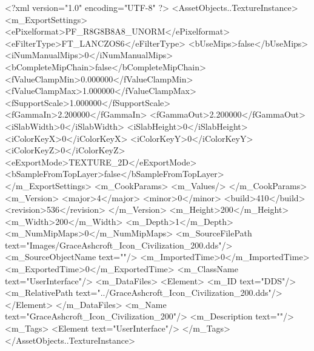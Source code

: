 <?xml version="1.0" encoding="UTF-8" ?>
<AssetObjects..TextureInstance>
	<m_ExportSettings>
		<ePixelformat>PF_R8G8B8A8_UNORM</ePixelformat>
		<eFilterType>FT_LANCZOS6</eFilterType>
		<bUseMips>false</bUseMips>
		<iNumManualMips>0</iNumManualMips>
		<bCompleteMipChain>false</bCompleteMipChain>
		<fValueClampMin>0.000000</fValueClampMin>
		<fValueClampMax>1.000000</fValueClampMax>
		<fSupportScale>1.000000</fSupportScale>
		<fGammaIn>2.200000</fGammaIn>
		<fGammaOut>2.200000</fGammaOut>
		<iSlabWidth>0</iSlabWidth>
		<iSlabHeight>0</iSlabHeight>
		<iColorKeyX>0</iColorKeyX>
		<iColorKeyY>0</iColorKeyY>
		<iColorKeyZ>0</iColorKeyZ>
		<eExportMode>TEXTURE_2D</eExportMode>
		<bSampleFromTopLayer>false</bSampleFromTopLayer>
	</m_ExportSettings>
	<m_CookParams>
		<m_Values/>
	</m_CookParams>
	<m_Version>
		<major>4</major>
		<minor>0</minor>
		<build>410</build>
		<revision>536</revision>
	</m_Version>
	<m_Height>200</m_Height>
	<m_Width>200</m_Width>
	<m_Depth>1</m_Depth>
	<m_NumMipMaps>0</m_NumMipMaps>
	<m_SourceFilePath text="Images/GraceAshcroft_Icon_Civilization_200.dds"/>
	<m_SourceObjectName text=""/>
	<m_ImportedTime>0</m_ImportedTime>
	<m_ExportedTime>0</m_ExportedTime>
	<m_ClassName text="UserInterface"/>
	<m_DataFiles>
		<Element>
			<m_ID text="DDS"/>
			<m_RelativePath text="../GraceAshcroft_Icon_Civilization_200.dds"/>
		</Element>
	</m_DataFiles>
	<m_Name text="GraceAshcroft_Icon_Civilization_200"/>
	<m_Description text=""/>
	<m_Tags>
		<Element text="UserInterface"/>
	</m_Tags>
</AssetObjects..TextureInstance>
